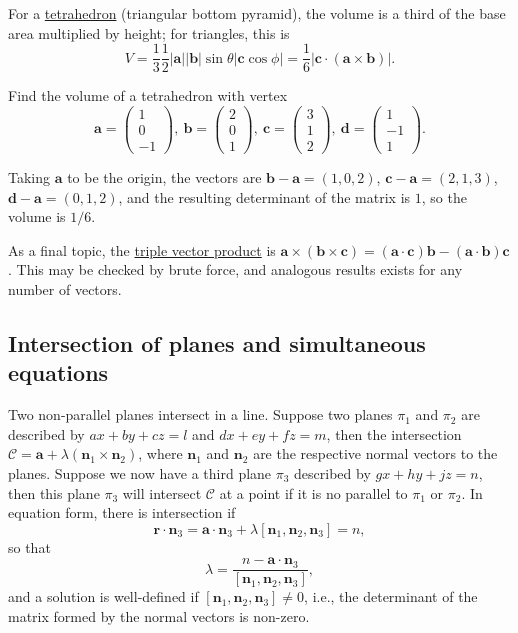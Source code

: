 \documentclass[10pt,notitlepage]{revtex4-1}
\newenvironment{example}[1][Example]{\begin{trivlist}
\item[\hskip \labelsep {\bfseries #1}]}{\end{trivlist}}
\newcommand{\ab}{{\boldsymbol{a}}}
\newcommand{\bb}{{\boldsymbol{b}}}
\newcommand{\cb}{{\boldsymbol{c}}}
\newcommand{\db}{{\boldsymbol{d}}}
\newcommand{\nb}{{\boldsymbol{n}}}
\begin{document}
For a \underline{tetrahedron} (triangular bottom pyramid), the volume is a third
of the base area multiplied by height; for triangles, this is
\begin{equation}
	V=\frac{1}{3}\frac{1}{2}|\ab||\bb|\sin\theta|\cb\cos\phi|=
	\frac{1}{6}|\cb\cdot(\ab\times\bb)|.
\end{equation}
\begin{example}
	Find the volume of a tetrahedron with vertex
	\begin{equation}
		\ab=\begin{pmatrix}1\\0\\-1\end{pmatrix},\
		\bb=\begin{pmatrix}2\\0\\1\end{pmatrix},\
		\cb=\begin{pmatrix}3\\1\\2\end{pmatrix},\
		\db=\begin{pmatrix}1\\-1\\1\end{pmatrix}.
	\end{equation}
	
	Taking $\ab$ to be the origin, the vectors are $\bb-\ab=(1,0,2)$,
	$\cb-\ab=(2,1,3)$, $\db-\ab=(0,1,2)$, and the resulting determinant of the
	matrix is $1$, so the volume is $1/6$.
\end{example}

As a final topic, the \underline{triple vector product} is
$\ab\times(\bb\times\cb) = (\ab\cdot\cb)\bb-(\ab\cdot\bb)\cb$. This may be
checked by brute force, and analogous results exists for any number of vectors.


\subsection{Intersection of planes and simultaneous equations}

Two non-parallel planes intersect in a line. Suppose two planes $\pi_1$ and
$\pi_2$ are described by $ax+by+cz=l$ and $dx+ey+fz=m$, then the intersection
$\mathcal{C}=\ab+\lambda(\nb_1\times\nb_2)$, where $\nb_1$ and $\nb_2$ are the
respective normal vectors to the planes. Suppose we now have a third plane
$\pi_3$ described by $gx+hy+jz=n$, then this plane $\pi_3$ will intersect
$\mathcal{C}$ at a point if it is no parallel to $\pi_1$ or $\pi_2$. In equation
form, there is intersection if
\begin{equation}
	\boldsymbol{r}\cdot\nb_3=\ab\cdot\nb_3+\lambda[\nb_1,\nb_2,\nb_3]=n,
\end{equation}
so that
\begin{equation}
	\lambda=\frac{n-\ab\cdot\nb_3}{[\nb_1,\nb_2,\nb_3]},
\end{equation}
and a solution is well-defined if $[\nb_1,\nb_2,\nb_3]\neq0$, i.e., the
determinant of the matrix formed by the normal vectors is non-zero.
\end{document}

